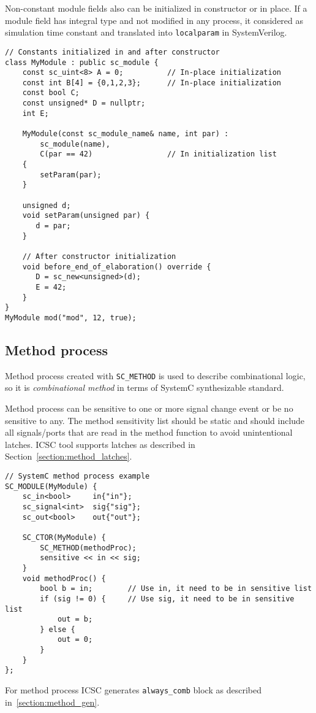Non-constant module fields also can be initialized in constructor or in place. If a module field has integral type and not modified in any process, it considered as simulation time constant and translated into {\tt localparam} in SystemVerilog. 

\begin{lstlisting}[style=mycpp]
// Constants initialized in and after constructor
class MyModule : public sc_module {
    const sc_uint<8> A = 0;          // In-place initialization
    const int B[4] = {0,1,2,3};      // In-place initialization
    const bool C;       
    const unsigned* D = nullptr;
    int E;
    
    MyModule(const sc_module_name& name, int par) :
        sc_module(name), 
        C(par == 42)                 // In initialization list
    {
        setParam(par);
    }
    
    unsigned d;
    void setParam(unsigned par) {
       d = par;
    }    
    
    // After constructor initialization
    void before_end_of_elaboration() override {
       D = sc_new<unsigned>(d);	     
       E = 42;
    }
}
MyModule mod("mod", 12, true);
\end{lstlisting}


\subsection{Method process}

Method process created with {\tt SC\_METHOD} is used to describe combinational logic, so it is \emph{combinational method} in terms of SystemC synthesizable standard. 

Method process can be sensitive to one or more signal change event or be no sensitive to any. The method sensitivity list should be static and should include all signals/ports that are read in the method function to avoid unintentional latches. ICSC tool supports latches as described in Section~\ref{section:method_latches}. 

\begin{lstlisting}[style=mycpp]
// SystemC method process example
SC_MODULE(MyModule) {
    sc_in<bool>     in{"in"};
    sc_signal<int>  sig{"sig"};
    sc_out<bool>    out{"out"};
    
    SC_CTOR(MyModule) {
        SC_METHOD(methodProc);
        sensitive << in << sig;
    }    
    void methodProc() {
    	bool b = in;        // Use in, it need to be in sensitive list
        if (sig != 0) {     // Use sig, it need to be in sensitive list
    	    out = b;
        } else {
            out = 0;
        }
    }
};
\end{lstlisting}
%
For method process ICSC generates {\tt always\_comb} block as described in~\ref{section:method_gen}.

